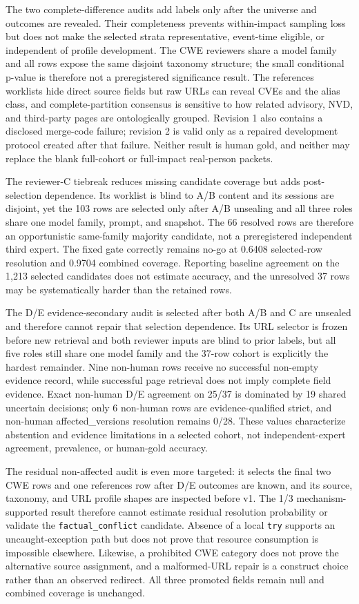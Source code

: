 The two complete-difference audits add labels only after the universe and outcomes are revealed. Their completeness prevents within-impact sampling loss but does not make the selected strata representative, event-time eligible, or independent of profile development. The CWE reviewers share a model family and all rows expose the same disjoint taxonomy structure; the small conditional p-value is therefore not a preregistered significance result. The references worklists hide direct source fields but raw URLs can reveal CVEs and the alias class, and complete-partition consensus is sensitive to how related advisory, NVD, and third-party pages are ontologically grouped. Revision 1 also contains a disclosed merge-code failure; revision 2 is valid only as a repaired development protocol created after that failure. Neither result is human gold, and neither may replace the blank full-cohort or full-impact real-person packets.

The reviewer-C tiebreak reduces missing candidate coverage but adds post-selection dependence. Its worklist is blind to A/B content and its sessions are disjoint, yet the 103 rows are selected only after A/B unsealing and all three roles share one model family, prompt, and snapshot. The 66 resolved rows are therefore an opportunistic same-family majority candidate, not a preregistered independent third expert. The fixed gate correctly remains no-go at 0.6408 selected-row resolution and 0.9704 combined coverage. Reporting baseline agreement on the 1,213 selected candidates does not estimate accuracy, and the unresolved 37 rows may be systematically harder than the retained rows.

The D/E evidence-secondary audit is selected after both A/B and C are unsealed and therefore cannot repair that selection dependence. Its URL selector is frozen before new retrieval and both reviewer inputs are blind to prior labels, but all five roles still share one model family and the 37-row cohort is explicitly the hardest remainder. Nine non-human rows receive no successful non-empty evidence record, while successful page retrieval does not imply complete field evidence. Exact non-human D/E agreement on 25/37 is dominated by 19 shared uncertain decisions; only 6 non-human rows are evidence-qualified strict, and non-human affected\_versions resolution remains 0/28. These values characterize abstention and evidence limitations in a selected cohort, not independent-expert agreement, prevalence, or human-gold accuracy.

The residual non-affected audit is even more targeted: it selects the final two CWE rows and one references row after D/E outcomes are known, and its source, taxonomy, and URL profile shapes are inspected before v1. The 1/3 mechanism-supported result therefore cannot estimate residual resolution probability or validate the \texttt{factual\_conflict} candidate. Absence of a local \texttt{try} supports an uncaught-exception path but does not prove that resource consumption is impossible elsewhere. Likewise, a prohibited CWE category does not prove the alternative source assignment, and a malformed-URL repair is a construct choice rather than an observed redirect. All three promoted fields remain null and combined coverage is unchanged.


